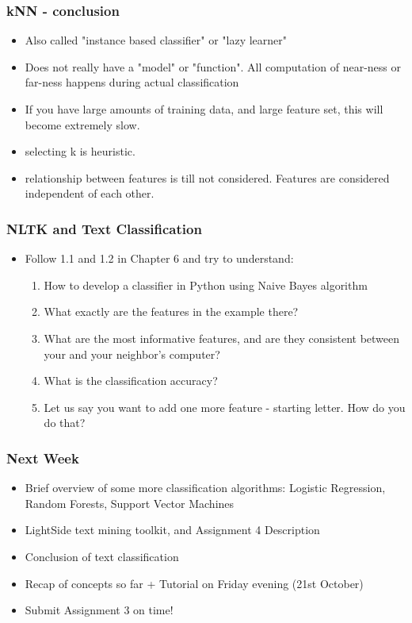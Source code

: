 \documentclass{beamer}
\begin{document}
\begin{frame}
\frametitle{kNN - conclusion}
\begin{itemize}
\item Also called "instance based classifier" or "lazy learner"
\item Does not really have a "model" or "function". All computation of near-ness or far-ness happens during actual classification
\item If you have large amounts of training data, and large feature set, this will become extremely slow. 
\item selecting k is heuristic.
\item relationship between features is till not considered. Features are considered independent of each other.
\end{itemize}
\end{frame}


\begin{frame}
\frametitle{NLTK and Text Classification}
\begin{itemize}
\item Follow 1.1 and 1.2 in Chapter 6 and try to understand:
\begin{enumerate}
\item How to develop a classifier in Python using Naive Bayes algorithm
\item What exactly are the features in the example there?
\item What are the most informative features, and are they consistent between your and your neighbor's computer?
\item What is the classification accuracy? 
\item Let us say you want to add one more feature - starting letter. How do you do that?
\end{enumerate}
\end{itemize}
\end{frame}

\begin{frame}
\frametitle{Next Week}
\begin{itemize}
\item Brief overview of some more classification algorithms: Logistic Regression, Random Forests, Support Vector Machines
\item LightSide text mining toolkit, and Assignment 4 Description
\item Conclusion of text classification
\item Recap of concepts so far + Tutorial on Friday evening (21st October)
\item Submit Assignment 3 on time!
\end{itemize}
\end{frame}
\end{document}
